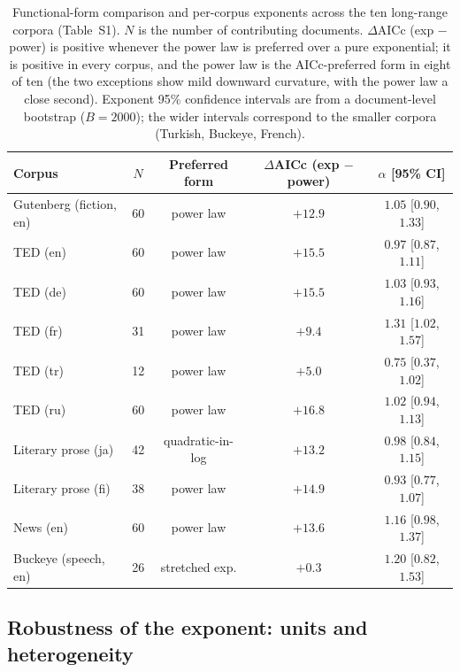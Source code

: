 \documentclass[11pt]{article}
\begin{document}
\renewcommand{\thetable}{S1}
\begin{table}[h]
\centering
\small
\begin{tabular}{lcccc}
\toprule
Corpus & $N$ & Preferred form & $\Delta$AICc (exp $-$ power) & $\alpha$ [95\% CI] \\
\midrule
Gutenberg (fiction, en) & 60 & power law & $+12.9$ & $1.05$ [$0.90$, $1.33$] \\
TED (en)                & 60 & power law & $+15.5$ & $0.97$ [$0.87$, $1.11$] \\
TED (de)                & 60 & power law & $+15.5$ & $1.03$ [$0.93$, $1.16$] \\
TED (fr)                & 31 & power law & $+9.4$  & $1.31$ [$1.02$, $1.57$] \\
TED (tr)                & 12 & power law & $+5.0$  & $0.75$ [$0.37$, $1.02$] \\
TED (ru)                & 60 & power law & $+16.8$ & $1.02$ [$0.94$, $1.13$] \\
Literary prose (ja)     & 42 & quadratic-in-log & $+13.2$ & $0.98$ [$0.84$, $1.15$] \\
Literary prose (fi)     & 38 & power law & $+14.9$ & $0.93$ [$0.77$, $1.07$] \\
News (en)               & 60 & power law & $+13.6$ & $1.16$ [$0.98$, $1.37$] \\
Buckeye (speech, en)    & 26 & stretched exp. & $+0.3$ & $1.20$ [$0.82$, $1.53$] \\
\bottomrule
\end{tabular}
\caption{Functional-form comparison and per-corpus exponents across the ten long-range corpora
(Table~S1). $N$ is the number of contributing documents. $\Delta$AICc (exp $-$ power) is positive
whenever the power law is preferred over a pure exponential; it is positive in every corpus, and the
power law is the AICc-preferred form in eight of ten (the two exceptions show mild downward curvature,
with the power law a close second). Exponent 95\% confidence intervals are from a document-level
bootstrap ($B=2000$); the wider intervals correspond to the smaller corpora (Turkish, Buckeye, French).}
\end{table}

\subsection*{Robustness of the exponent: units and heterogeneity}
\end{document}
